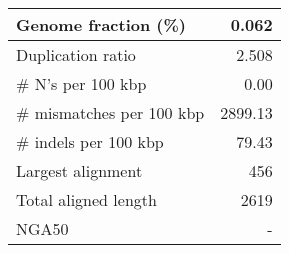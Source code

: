 \documentclass[12pt,a4paper]{article}
\begin{document}
\begin{table}[ht]
\begin{center}
\begin{tabular}{|l*{1}{|r}|}
Genome fraction (\%) & 0.062 \\ \hline
Duplication ratio & 2.508 \\ \hline
\# N's per 100 kbp & 0.00 \\ \hline
\# mismatches per 100 kbp & 2899.13 \\ \hline
\# indels per 100 kbp & 79.43 \\ \hline
Largest alignment & 456 \\ \hline
Total aligned length & 2619 \\ \hline
NGA50 & - \\ \hline
\end{tabular}
\end{center}
\end{table}
\end{document}
